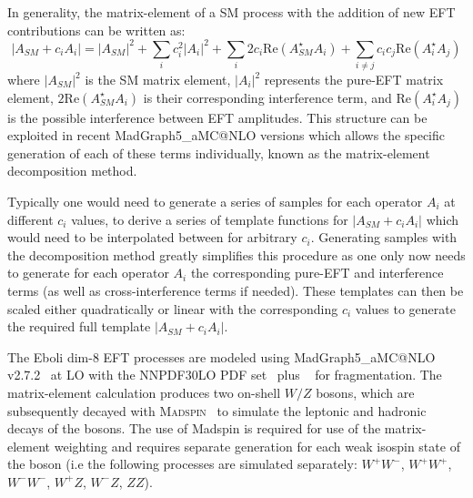In generality, the matrix-element of a SM process with the addition of new EFT contributions can be written as:
\begin{equation}
  |A_{SM}+c_iA_i|=|A_{SM}|^2+\sum\limits_i c_i^2|A_{i}|^2+ \sum\limits_i 2 c_i \mathrm{Re}(A_{SM}^\star A_i) +\sum\limits_{i\neq j} c_i c_j \mathrm{Re}(A_i^\star A_j)
\end{equation}
where $|A_{SM}|^2$ is the SM matrix element, $|A_{i}|^2$ represents the pure-EFT matrix element, $2 \mathrm{Re}(A_{SM}^\star A_i)$ is their corresponding interference term, and $\mathrm{Re}(A_i^\star A_j)$ is the possible interference between EFT amplitudes.
This structure can be exploited in recent MadGraph5\_aMC@NLO versions which allows the specific generation of each of these terms individually, known as the matrix-element decomposition method.

Typically one would need to generate a series of samples for each operator $A_i$ at different $c_i$ values, to derive a series of template functions for $|A_{SM}+c_iA_i|$ which would need to be interpolated between for arbitrary $c_i$. Generating samples with the decomposition method greatly simplifies this procedure as one only now needs to generate for each operator $A_i$ the corresponding pure-EFT and interference terms (as well as cross-interference terms if needed). These templates can then be scaled either quadratically or linear with the corresponding $c_i$ values to generate the required full template $|A_{SM}+c_iA_i|$.

The Eboli dim-8 EFT processes are modeled using MadGraph5\_aMC@NLO v2.7.2~\cite{Alwall:2014hca} at LO with the \textsc{NNPDF30LO} PDF set~\cite{Ball:2012cx} plus ~\cite{Sjostrand:2007gs} for fragmentation.
The matrix-element calculation produces two on-shell $W/Z$ bosons, which are subsequently decayed with \textsc{Madspin}~\cite{Artoisenet:2012st} to simulate the leptonic and hadronic decays of the bosons.
The use of Madspin is required for use of the matrix-element weighting and requires separate generation for each weak isospin state of the boson (i.e the following processes are simulated separately: $W^+W^-$, $W^+W^+$, $W^-W^-$, $W^+Z$, $W^-Z$, $ZZ$). \\ \\



